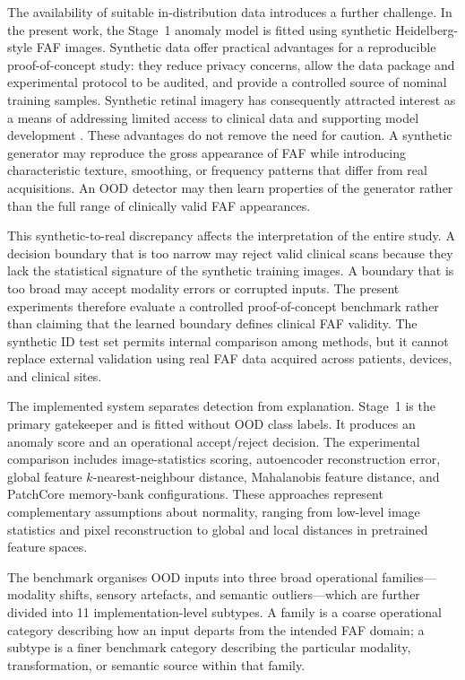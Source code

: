 \documentclass[fleqn,12pt]{olplainarticle}
\begin{document}
The availability of suitable in-distribution data introduces a further challenge. In the present work, the Stage~1 anomaly model is fitted using synthetic Heidelberg-style FAF images. Synthetic data offer practical advantages for a reproducible proof-of-concept study: they reduce privacy concerns, allow the data package and experimental protocol to be audited, and provide a controlled source of nominal training samples. Synthetic retinal imagery has consequently attracted interest as a means of addressing limited access to clinical data and supporting model development \cite{chen2021synthetic,veturi2023syntheye}. These advantages do not remove the need for caution. A synthetic generator may reproduce the gross appearance of FAF while introducing characteristic texture, smoothing, or frequency patterns that differ from real acquisitions. An OOD detector may then learn properties of the generator rather than the full range of clinically valid FAF appearances.

This synthetic-to-real discrepancy affects the interpretation of the entire study. A decision boundary that is too narrow may reject valid clinical scans because they lack the statistical signature of the synthetic training images. A boundary that is too broad may accept modality errors or corrupted inputs. The present experiments therefore evaluate a controlled proof-of-concept benchmark rather than claiming that the learned boundary defines clinical FAF validity. The synthetic ID test set permits internal comparison among methods, but it cannot replace external validation using real FAF data acquired across patients, devices, and clinical sites.

The implemented system separates detection from explanation. Stage~1 is the primary gatekeeper and is fitted without OOD class labels. It produces an anomaly score and an operational accept/reject decision. The experimental comparison includes image-statistics scoring, autoencoder reconstruction error, global feature $k$-nearest-neighbour distance, Mahalanobis feature distance, and PatchCore memory-bank configurations. These approaches represent complementary assumptions about normality, ranging from low-level image statistics and pixel reconstruction to global and local distances in pretrained feature spaces.

The benchmark organises OOD inputs into three broad operational
families---modality shifts, sensory artefacts, and semantic outliers---which
are further divided into 11 implementation-level subtypes. A family is a
coarse operational category describing how an input departs from the intended
FAF domain; a subtype is a finer benchmark category describing the particular
modality, transformation, or semantic source within that family.
\end{document}

